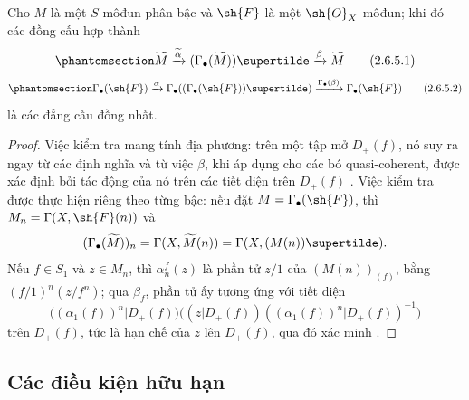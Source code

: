 \documentclass[oneside,10pt]{amsart}
\let\EGAOriginalLabel\label
\renewcommand{\label}[1]{\phantomsection\EGAOriginalLabel{#1}}
\begin{document}
\begin{proposition}[2.6.5]
\label{II.2.6.5}
Cho $M$ là một $S$-môđun phân bậc và $\sh{F}$ là một $\sh{O}_X$-môđun; khi đó các đồng cấu hợp thành
\[
\label{II.2.6.5.1}
  \widetilde{M}
  \xrightarrow{\widetilde{\alpha}}(\Gamma_\bullet(\widetilde{M}))\supertilde
  \xrightarrow{\beta}\widetilde{M}
\tag{2.6.5.1}
\]
\[
\label{II.2.6.5.2}
  \Gamma_\bullet(\sh{F})
  \xrightarrow{\alpha}\Gamma_\bullet((\Gamma_\bullet(\sh{F}))\supertilde)
  \xrightarrow{\Gamma_\bullet(\beta)}\Gamma_\bullet(\sh{F})
\tag{2.6.5.2}
\]
là các đẳng cấu đồng nhất.
\end{proposition}

\begin{proof}
Việc kiểm tra  mang tính địa phương: trên một tập mở $D_+(f)$, nó suy ra ngay từ các định nghĩa và từ việc $\beta$, khi áp dụng cho các bó quasi-coherent, được xác định bởi tác động của nó trên các tiết diện trên $D_+(f)$ .
Việc kiểm tra  được thực hiện riêng theo từng bậc: nếu đặt $M=\Gamma_\bullet(\sh{F})$, thì $M_n=\Gamma(X,\sh{F}(n))$ và
\[
  (\Gamma_\bullet(\widetilde{M}))_n
  =\Gamma(X,\widetilde{M}(n))
  =\Gamma(X,(M(n))\supertilde).
\]
Nếu $f\in S_1$ và $z\in M_n$, thì $\alpha_n^f(z)$ là phần tử $z/1$ của $(M(n))_{(f)}$, bằng $(f/1)^n(z/f^n)$; qua $\beta_f$, phần tử ấy tương ứng với tiết diện
\[
  \Big((\alpha_1(f))^n|D_+(f)\Big)
  \Big((z|D_+(f))((\alpha_1(f))^n|D_+(f))^{-1}\Big)
\]
trên $D_+(f)$, tức là hạn chế của $z$ lên $D_+(f)$, qua đó xác minh .
\end{proof}

\subsection{Các điều kiện hữu hạn}
\label{subsection:II.2.7}
\end{document}
